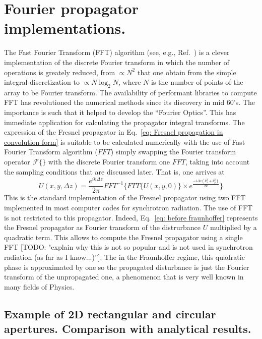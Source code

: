 \documentclass{iucr}              %
\newcommand{\todo}[1]{{\color{red}[TODO: "#1'']}}
\begin{document}
\section{Fourier propagator implementations.}
\label{ch: fourier-propagators}

The Fast Fourier Transform (FFT) algorithm (see, e.g., Ref.~\cite{10.2307/2003354}) is a clever implementation of the discrete Fourier transform in which the number of operations is greately reduced, from $\propto N^2$ that one obtain from the simple integral discretization to $\propto N \log_2 N$, where $N$ is the number of points of the array to be Fourier transform. The availability of performant libraries to compute FFT has revolutioned the numerical methods since its discovery in mid 60's. The importance is such that it helped to develop the ``Fourier Optics''. This has immediate application for calculating the propagator integral transforms. 
The expression of the Fresnel propagator in Eq.~\ref{eq: Fresnel propagation in convolution form} is suitable to be calculated numerically with the use of Fast Fourier Transform algorithm ($FFT$) simply swapping the Fourier transform operator $\mathcal{F}\big\{\big\}$ with the discrete Fourier transform one $FFT$, taking into account the sampling conditions that are discussed later.  That is, one arrives at
\begin{equation}\label{eq: numerical convolution form of angular spectrum}
U(x, y, \Delta z)= \frac{e^{ik\Delta z}}{2\pi} FFT^{-1}\Big\{ FTT\big\{U(x, y, 0)\big\} \times e^{\frac{-i \Delta z (k_x^2 + k_y^2) }{2k}} \Big\} 
\end{equation} 
This is the standard implementation of the Fresnel propagator using two FFT implemented in most computer codes for synchrotron radiation. The use of FFT is not restricted to this propagator. Indeed, Eq.~\ref{eq: before fraunhoffer} represents the Fresnel propagator as Fourier transform of the distrurbance $U$ multiplied by a quadratic term. This allows to compute the Fresnel propagator using a single FFT \todo{explain why this is not so popular and is not used in synchrotron radiation (as far as I know...)}. The in the Fraunhoffer regime, this quadratic phase is approximated by one so the propagated disturbance is just the Fourier transform of the unpropagated one, a phenomenon that is very well known in many fields of Physics. 


\subsection{Example of 2D rectangular and circular apertures. Comparison with analytical results.}
\end{document}
